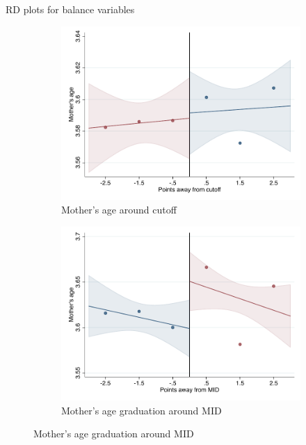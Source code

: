 \documentclass[notes,11pt, aspectratio=169]{beamer}
\begin{document}
\begin{frame}{RD plots for balance variables}
\hyperlink{balance_rd_plot}{}
\begin{figure}

    \begin{subfigure}{0.45\textwidth}
        \centering
        \caption{Mother's age around cutoff}
        \includegraphics[width=\textwidth]{04_Figures/rd_plot_tau_edad_mad_IPN3.pdf}
    \end{subfigure}
    \begin{subfigure}{0.45\textwidth}
        \centering
        \caption{Mother's age graduation around MID}
        \includegraphics[width=\textwidth]{04_Figures/rd_plot_mid_edad_mad_IPN3.pdf}
    \end{subfigure}
    
\end{figure}
\end{frame}
\end{document}
